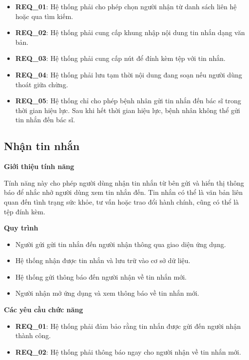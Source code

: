 \begin{itemize}

  \item \textbf{REQ\_01}: Hệ thống phải cho phép chọn người nhận từ danh sách liên hệ hoặc qua tìm kiếm.

  \item \textbf{REQ\_02}: Hệ thống phải cung cấp khung nhập nội dung tin nhắn dạng văn bản.

  \item \textbf{REQ\_03}: Hệ thống phải cung cấp nút để đính kèm tệp với tin nhắn.

  \item \textbf{REQ\_04}: Hệ thống phải lưu tạm thời nội dung đang soạn nếu người dùng thoát giữa chừng.

  \item \textbf{REQ\_05}: Hệ thống chỉ cho phép bệnh nhân gửi tin nhắn đến bác sĩ trong thời gian hiệu lực. Sau khi hết thời gian hiệu lực, bệnh nhân không thể gửi tin nhắn đến bác sĩ.

\end{itemize}

\subsection{Nhận tin nhắn}

\noindent \textbf{Giới thiệu tính năng}

Tính năng này cho phép người dùng nhận tin nhắn từ bên gửi và hiển thị thông báo để nhắc nhở người dùng xem tin nhắn đến. Tin nhắn có thể là văn bản liên quan đến tình trạng sức khỏe, tư vấn hoặc trao đổi hành chính, cũng có thể là tệp đính kèm.

\noindent \textbf{Quy trình}

\begin{itemize}
  \item Người gửi gửi tin nhắn đến người nhận thông qua giao diện ứng dụng.
  \item Hệ thống nhận được tin nhắn và lưu trữ vào cơ sở dữ liệu.
  \item Hệ thống gửi thông báo đến người nhận về tin nhắn mới.
  \item Người nhận mở ứng dụng và xem thông báo về tin nhắn mới.
\end{itemize}

\noindent \textbf{Các yêu cầu chức năng}

\begin{itemize}

  \item \textbf{REQ\_01}: Hệ thống phải đảm bảo rằng tin nhắn được gửi đến người nhận thành công.
  \item \textbf{REQ\_02}: Hệ thống phải thông báo ngay cho người nhận về tin nhắn mới.

\end{itemize}

